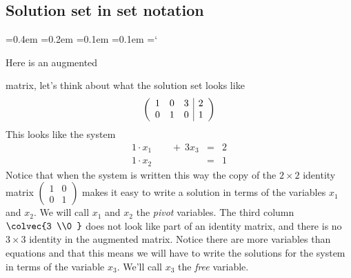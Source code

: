 
\subsection*{Solution set in set notation}
{\ttfamily
{}\font=0.4em
\font=0.2em
\font=0.1em
\font=0.1em
\hyphenchar\font=`\-


\hypertarget{solution_sets_for_systems_of_linear_equations_example}{Here is an augmented} matrix, let's think about what the solution set looks like
$$ \left( \begin{array}{ccc | c}
1 & 0 & 3 & 2 \\
0 & 1 & 0 & 1
\end{array} \right)
$$
This looks like the system
\begin{eqnarray*}
1\cdot x_1\phantom{+x_2}\ + \ 3x_3 &=& 2\\
 1\cdot x_2\phantom{\ +\ 3x_3 } &=& 1
\end{eqnarray*}
Notice that when the system is written this way the copy of the $2 \times 2$ identity matrix
$
\left( \begin{array}{cc}
1 & 0  \\ 0 & 1
\end{array} \right)
$
makes it easy to write a solution in terms of the variables $x_1$ and $x_2$. We will call  $x_1$ and $x_2$ the \emph{pivot} variables. The third column $\colvec{3 \\0 }$ does not look like part of an identity matrix, and there is no $3\times 3$ identity in the augmented matrix. Notice there are more variables than equations and  that this means we will have to write the solutions for the system in terms of the variable $x_3$. We'll call $x_3$ the \emph{free} variable.

}
